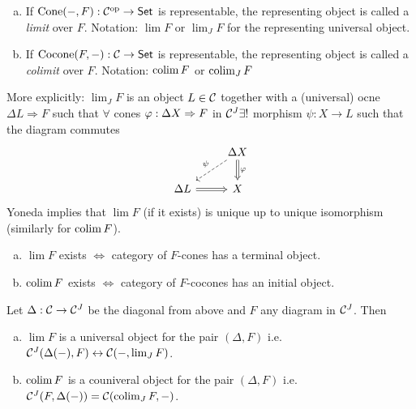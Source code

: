 \documentclass[a4paper]{report}
\begin{document}
\begin{defi}
\begin{enumerate}[(a)]
  \item If $\operatorname{Cone}(-,F): \mathcal{C}^\text{op} \to \mathsf{Set}$ is representable, the representing object is called a \emph{limit} over $F$. Notation: $\lim F$ or $\lim_{J} F$ for the representing universal object.
  \item If $\operatorname{Cocone}(F, -): \mathcal{C} \to \mathsf{Set}$ is representable, the representing object is called a \emph{colimit} over $F$. Notation: $\operatorname*{colim} F$ or $\operatorname*{colim}_{J} F$
\end{enumerate}

More explicitly: $\lim_{J} F$ is an object $L \in \mathcal{C}$ together with a (universal) ocne $\Delta L \Rightarrow F$ such that $\forall$ cones $\varphi: \Delta X \Rightarrow F$ in $\mathcal{C}^{J} \exists!$ morphism $\psi: X \to L$ such that the diagram commutes \[\begin{tikzcd}
                               & \Delta X \arrow[d, "\varphi", Rightarrow] \arrow[ld, "\psi"', dashed] \\
\Delta L \arrow[r, Rightarrow] & X
\end{tikzcd}\]
Yoneda implies that $\lim F$ (if it exists) is unique up to unique isomorphism (similarly for $\operatorname*{colim} F$).
\end{defi}

\begin{exer}
          \begin{enumerate}[(a)]
\item $\lim F$ exists $\iff$ category of $F$-cones has a terminal object.
\item $\operatorname*{colim} F$ exists $\iff$ category of $F$-cocones has an initial object.
          \end{enumerate}
        \end{exer}
\begin{prop}[Exercise]
  Let $\Delta : \mathcal{C} \to \mathcal{C}^{J}$ be the diagonal from above and $F$ any diagram in $\mathcal{C}^{J}$. Then
  \begin{enumerate}[(a)]
    \item $\lim F$ is a universal object for the pair $(\Delta, F)$ i.e. $\mathcal{C}^{J}(\Delta(-), F) \leftrightarrow \mathcal{C}(-, \lim_{J} F)$.
          \item $\operatorname*{colim} F$ is a couniveral object for the pair $(\Delta, F)$ i.e. $\mathcal{C}^{J}(F, \Delta(-)) = \mathcal{C}(\operatorname*{colim}_{J} F, -)$.
  \end{enumerate}

\end{prop}
        \begin{exmps}

        \end{exmps}
\end{document}
